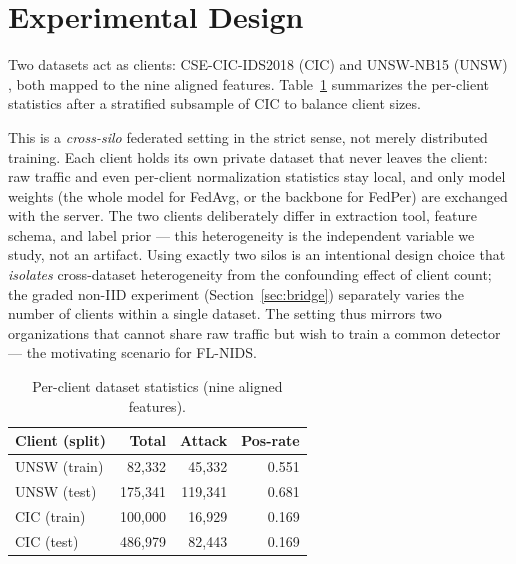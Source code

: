 \documentclass[11pt,a4paper]{article}
\begin{document}
\section{Experimental Design}
Two datasets act as clients: CSE-CIC-IDS2018 (CIC) \cite{cicids} and UNSW-NB15
(UNSW) \cite{unsw}, both mapped to the nine aligned features. Table~\ref{tab:data} summarizes the per-client
statistics after a stratified subsample of CIC to balance client sizes.

This is a \emph{cross-silo} federated setting in the strict sense, not merely
distributed training. Each client holds its own private dataset that never leaves
the client: raw traffic and even per-client normalization statistics stay local,
and only model weights (the whole model for FedAvg, or the backbone for FedPer)
are exchanged with the server. The two clients deliberately differ in extraction
tool, feature schema, and label prior --- this heterogeneity is the independent
variable we study, not an artifact. Using exactly two silos is an intentional
design choice that \emph{isolates} cross-dataset heterogeneity from the confounding
effect of client count; the graded non-IID experiment (Section~\ref{sec:bridge})
separately varies the number of clients within a single dataset. The setting thus
mirrors two organizations that cannot share raw traffic but wish to train a common
detector --- the motivating scenario for FL-NIDS.

\begin{table}[htbp]
\centering\small
\caption{Per-client dataset statistics (nine aligned features).}
\label{tab:data}
\begin{tabular}{@{}lrrr@{}}
\toprule
Client (split) & Total & Attack & Pos-rate \\
\midrule
UNSW (train) & 82{,}332  & 45{,}332 & 0.551 \\
UNSW (test)  & 175{,}341 & 119{,}341 & 0.681 \\
CIC (train)  & 100{,}000 & 16{,}929 & 0.169 \\
CIC (test)   & 486{,}979 & 82{,}443 & 0.169 \\
\bottomrule
\end{tabular}
\end{table}
\end{document}
